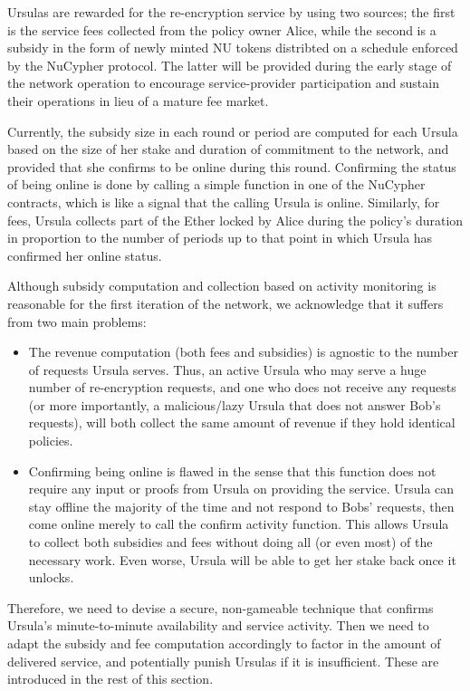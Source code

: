 \documentclass{llncs}
\begin{document}
 Ursulas are rewarded for the re-encryption service by using two sources; the first is the service fees collected from the policy owner Alice, while the second is a subsidy in the form of newly minted NU tokens distribted on a schedule enforced by the NuCypher protocol. The latter will be provided during the early stage of the network operation to encourage service-provider participation and sustain their operations in lieu of a mature fee market.

Currently, the subsidy size in each round or period are computed for each Ursula based on the size of her stake and duration of commitment to the network, and provided that she confirms to be online during this round. Confirming the status of being online is done by calling a simple function in one of the NuCypher contracts, which is like a signal that the calling Ursula is online. Similarly, for fees, Ursula collects part of the Ether locked by Alice during the policy's duration in proportion to the number of periods up to that point in which Ursula has confirmed her online status.


Although subsidy computation and collection based on activity monitoring is reasonable for the first iteration of the network, we acknowledge that it suffers from two main problems:
\begin{itemize}
\setlength{\itemsep}{0pt}
\item The revenue computation (both fees and subsidies) is agnostic to the number of requests Ursula serves. Thus, an active Ursula who may serve a huge number of re-encryption requests, and one who does not receive any requests (or more importantly, a malicious/lazy Ursula that does not answer Bob's requests), will both collect the same amount of revenue if they hold identical policies.

\item Confirming being online is flawed in the sense that this function does not require any input or proofs from Ursula on providing the service. Ursula can stay offline the majority of the time and not respond to Bobs' requests, then come online merely to call the confirm activity function. This allows Ursula to collect both subsidies and fees without doing all (or even most) of the necessary work. Even worse, Ursula will be able to get her stake back once it unlocks.
\end{itemize}


Therefore, we need to devise a secure, non-gameable technique that confirms Ursula's minute-to-minute availability and service activity. Then we need to adapt the subsidy and fee computation accordingly to factor in the amount of delivered service, and potentially punish Ursulas if it is insufficient. These are introduced in the rest of this section. \\
\end{document}
